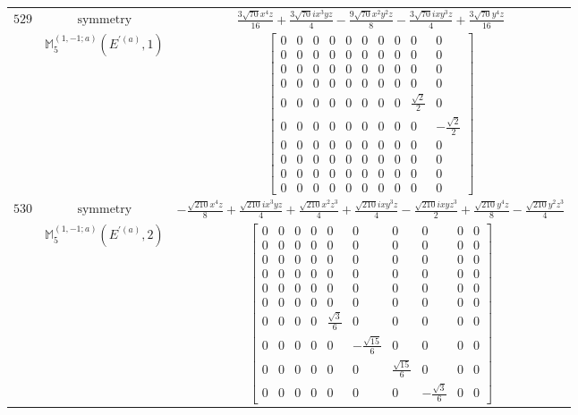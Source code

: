\documentclass[fleqn,8pt,landscape]{jsarticle}
\begin{document}
\begin{longtable}{ccc}
$ 529 $ & $ \text{symmetry} $ & $ \frac{3 \sqrt{70} x^{4} z}{16} + \frac{3 \sqrt{70} i x^{3} y z}{4} - \frac{9 \sqrt{70} x^{2} y^{2} z}{8} - \frac{3 \sqrt{70} i x y^{3} z}{4} + \frac{3 \sqrt{70} y^{4} z}{16} $ \\
$  $ & $ \mathbb{M}_{5}^{(1,-1;a)}(E^{\prime(a)},1) $ & $ \begin{bmatrix} 0 & 0 & 0 & 0 & 0 & 0 & 0 & 0 & 0 & 0 \\ 0 & 0 & 0 & 0 & 0 & 0 & 0 & 0 & 0 & 0 \\ 0 & 0 & 0 & 0 & 0 & 0 & 0 & 0 & 0 & 0 \\ 0 & 0 & 0 & 0 & 0 & 0 & 0 & 0 & 0 & 0 \\ 0 & 0 & 0 & 0 & 0 & 0 & 0 & 0 & \frac{\sqrt{2}}{2} & 0 \\ 0 & 0 & 0 & 0 & 0 & 0 & 0 & 0 & 0 & - \frac{\sqrt{2}}{2} \\ 0 & 0 & 0 & 0 & 0 & 0 & 0 & 0 & 0 & 0 \\ 0 & 0 & 0 & 0 & 0 & 0 & 0 & 0 & 0 & 0 \\ 0 & 0 & 0 & 0 & 0 & 0 & 0 & 0 & 0 & 0 \\ 0 & 0 & 0 & 0 & 0 & 0 & 0 & 0 & 0 & 0 \end{bmatrix} $ \\ \hline
$ 530 $ & $ \text{symmetry} $ & $ - \frac{\sqrt{210} x^{4} z}{8} + \frac{\sqrt{210} i x^{3} y z}{4} + \frac{\sqrt{210} x^{2} z^{3}}{4} + \frac{\sqrt{210} i x y^{3} z}{4} - \frac{\sqrt{210} i x y z^{3}}{2} + \frac{\sqrt{210} y^{4} z}{8} - \frac{\sqrt{210} y^{2} z^{3}}{4} $ \\
$  $ & $ \mathbb{M}_{5}^{(1,-1;a)}(E^{\prime(a)},2) $ & $ \begin{bmatrix} 0 & 0 & 0 & 0 & 0 & 0 & 0 & 0 & 0 & 0 \\ 0 & 0 & 0 & 0 & 0 & 0 & 0 & 0 & 0 & 0 \\ 0 & 0 & 0 & 0 & 0 & 0 & 0 & 0 & 0 & 0 \\ 0 & 0 & 0 & 0 & 0 & 0 & 0 & 0 & 0 & 0 \\ 0 & 0 & 0 & 0 & 0 & 0 & 0 & 0 & 0 & 0 \\ 0 & 0 & 0 & 0 & 0 & 0 & 0 & 0 & 0 & 0 \\ 0 & 0 & 0 & 0 & \frac{\sqrt{3}}{6} & 0 & 0 & 0 & 0 & 0 \\ 0 & 0 & 0 & 0 & 0 & - \frac{\sqrt{15}}{6} & 0 & 0 & 0 & 0 \\ 0 & 0 & 0 & 0 & 0 & 0 & \frac{\sqrt{15}}{6} & 0 & 0 & 0 \\ 0 & 0 & 0 & 0 & 0 & 0 & 0 & - \frac{\sqrt{3}}{6} & 0 & 0 \end{bmatrix} $ \\ \hline

\end{longtable}
\end{document}
